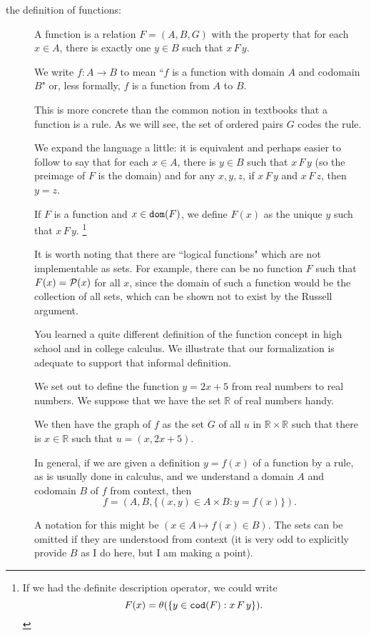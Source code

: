\documentclass[12pt]{article}
\begin{document}
\begin{description}
\item[the definition of functions:]

A function is a relation $F = (A,B,G)$ with the property that for each $x \in A$, there is exactly one $y \in B$ such that $x \, F \, y$.

We write $f:A \rightarrow B$ to mean ``$f$ is a function with domain $A$ and codomain $B$" or, less formally, $f$ is a function from $A$ to $B$.

This is more concrete than the common notion in textbooks that a function is a rule.  As we will see, the set of ordered pairs $G$ codes the rule.

We expand the language a little:  it is equivalent and perhaps easier to follow to say that for each $x \in A$, there is $y \in B$ such that $x \, F\, y$ (so the preimage of $F$ is the domain) and for any $x,y,z$, if $x \, F \, y$ and $x \, F\, z$, then $y=z$.

If $F$ is a function and $x \in {\tt dom}(F)$, we define $F(x)$ as the unique $y$ such that $x \, F \, y$.  \footnote{If we had the definite description operator, we could write $$F(x) = \theta(\{y\in {\tt cod}(F):x \, F \, y\}).$$}

It is worth noting that there are ``logical functions" which are not implementable as sets.  For example,
there can be no function $F$ such that $F(x) = {\cal P}(x)$ for all $x$, since the domain of such a function would be the collection of all sets, which can be shown not to exist by the Russell argument.

You learned a quite different definition of the function concept in high school and in college calculus.  We illustrate that our formalization is adequate to support that informal definition.

We set out to define the function $y=2x+5$ from real numbers to real numbers.  We suppose that we have the set
$\mathbb R$ of real numbers handy.

We then have the graph of $f$ as the set $G$ of all $u$ in $\mathbb R \times \mathbb R$ such that there is $x \in \mathbb R$ such that $u = (x,2x+5)$.

In general, if we are given a definition $y = f(x)$ of a function by a rule, as is usually done in calculus, and we understand a domain $A$ and codomain $B$ of $f$ from context,
then $$f=(A,B,\{(x,y) \in A \times B:y=f(x)\}).$$

A notation for this might be $(x\in A \mapsto f(x)\in B)$.  The sets can be omitted if they are understood from context (it is very odd to explicitly provide $B$ as I do here, but I am making a point).


\end{description}
\end{document}
